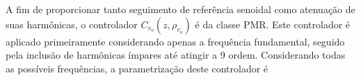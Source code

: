 \documentclass[repeatfields,oneside,overleaf]{tcc}
\newcommand{\mycdot}{ \, }
\newcommand{\myvo}{ {v_o} }
\newcommand{\myC}[2][]{ C_{#1} \left( #2 \right) }
\newcommand{\myoC}[2][]{ \overline{C_{#1}} \left( #2 \right) }
\newcommand{\myCzrho}[1]{ \myC[#1]{z, \rho_{#1}} }
\begin{document}
A fim de proporcionar tanto seguimento de referência senoidal como atenuação de suas harmônicas, o controlador $\myCzrho{\myvo}$ é da classe PMR.
Este controlador é aplicado primeiramente considerando apenas a frequência fundamental, seguido pela inclusão de harmônicas ímpares até atingir a 9{\textordfeminine} ordem.
Considerando todas as possíveis frequências, a parametrização deste controlador é
\end{document}
